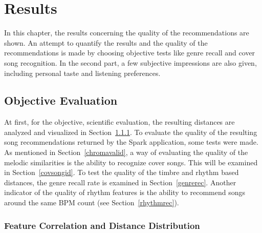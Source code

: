 
\chapter{Results}\label{bds2}

In this chapter, the results concerning the quality of the recommendations are shown. 
An attempt to quantify the results and the quality of the recommendations is made by choosing objective tests like genre recall and cover song recognition. In the second part, a few subjective impressions are also given, including personal taste and listening preferences. 

\section{Objective Evaluation}

At first, for the objective, scientific evaluation, the resulting distances are analyzed and visualized in Section~\ref{featqual}.
To evaluate the quality of the resulting song recommendations returned by the Spark application, some tests were made. As mentioned in Section~\ref{chromavalid}, a way of evaluating the quality of the melodic similarities is the ability to recognize cover songs. This will be examined in Section~\ref{covsongid}. To test the quality of the timbre and rhythm based distances, the genre recall rate is examined in Section~\ref{genrerec}. Another indicator of the quality of rhythm features is the ability to recommend songs around the same BPM count (see Section~\ref{rhythmrec}). 
 

\subsection{Feature Correlation and Distance Distribution}\label{featqual}

